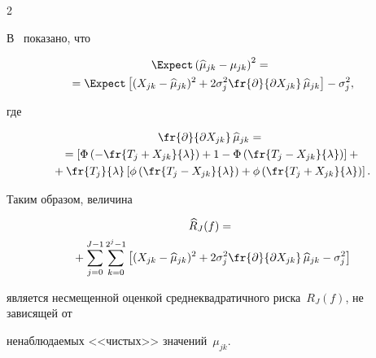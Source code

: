 \begin{multicols}{2}
\begin{equation*}
\end{equation*}

В~\cite{HL10} показано, что

\begin{multline*}

\Expect\left(\widehat{\mu}_{jk}-\mu_{jk}\right)^2={}\\

{}=

\Expect\left[(X_{jk}-\widehat{\mu}_{jk})^2+2\sigma_j^2

\fr{\partial}{\partial X_{jk}}\,\widehat{\mu}_{jk}\right]-\sigma_j^2,

\end{multline*}

где



\noindent

\begin{multline*}

\fr{\partial}{\partial X_{jk}}\,\widehat{\mu}_{jk}={}\\

{}=

\left[\Phi\left(-\fr{T_j+X_{jk}}{\lambda}\right)+1-

\Phi\left(\fr{T_j-X_{jk}}{\lambda}\right)\right]+{}\\

{}+

\fr{T_j}{\lambda}\left[\phi\left(\fr{T_j-X_{jk}}{\lambda}\right)+

\phi\left(\fr{T_j+X_{jk}}{\lambda}\right)\right].

\end{multline*}

Таким образом, величина

\begin{multline}

\label{Risk_Estimate}

\widehat{R}_J(f)={}\\

{}+\sum\limits_{j=0}^{J-1}\sum\limits_{k=0}^{2^j-1}

\left[(X_{jk}-\widehat{\mu}_{jk})^2+2\sigma_j^2

\fr{\partial}{\partial X_{jk}}\,\widehat{\mu}_{jk}-\sigma_j^2\right]

\end{multline}

является несмещенной оценкой среднеквадратичного риска~$R_J(f)$, не зависящей от 

ненаблюдаемых <<чистых>> значений~$\mu_{jk}$.




\end{multicols}
